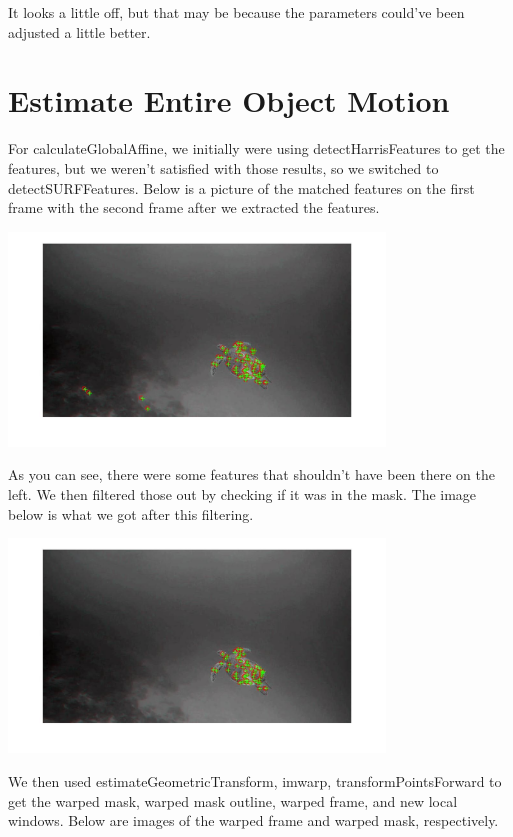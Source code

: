 \documentclass{article}
\begin{document}
	It looks a little off, but that may be because the parameters could’ve been adjusted a little better.
	
	
	\section{Estimate Entire Object Motion}
	For calculateGlobalAffine, we initially were using detectHarrisFeatures to get the features, but we weren’t satisfied with those results, so we switched to detectSURFFeatures. Below is a picture of the matched features on the first frame with the second frame after we extracted the features. 
	
	\begin{center}
		\includegraphics[width=100mm]{img/i5}
	\end{center}

	As you can see, there were some features that shouldn’t have been there on the left. We then filtered those out by checking if it was in the mask. The image below is what we got after this filtering. 
	
	\begin{center}
		\includegraphics[width=100mm]{img/i6}
	\end{center}

	We then used estimateGeometricTransform, imwarp, transformPointsForward to get the warped mask, warped mask outline, warped frame, and new local windows.
	Below are images of the warped frame and warped mask, respectively.
	
\end{document}
